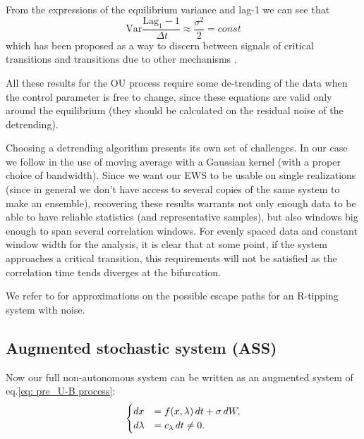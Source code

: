 From the expressions of the equilibrium variance and lag-1 we can see that 
\begin{equation}
	\mathrm{Var}\frac{\mathrm{Lag}_{1}-1}{\, \Delta t}\approx \frac{\sigma^2}{2}=const
	\label{eq:constante}
\end{equation}
which has been proposed as a way to discern between signals of critical transitions and transitions due to other mechanisms \citep{..}.


All these results for the OU process require some de-trending of the data when the control parameter is free to change, since these equations are valid only around the equilibrium (they should be calculated on the residual noise of the detrending).

Choosing a detrending algorithm presents its own set of challenges. 
In our case we follow \citep{..} in the use of moving average with a Gaussian kernel (with  a proper choice of bandwidth). 
Since we want our EWS to be usable on single realizations (since in general we don't have access to several copies of the same system to make an ensemble), recovering these results warrants not only enough data to be able to have reliable statistics (and representative samples), but also windows big enough to span several correlation windows. 
For evenly spaced data and constant window width for the analysis, it is clear that at some point, if the system approaches a critical transition, this requirements will not be satisfied as the correlation time tends diverges at the bifurcation.

We refer to \cite{Ritchie2016} for approximations on the possible escape paths for an R-tipping system with noise.

\subsection{Augmented stochastic  system (ASS)}
Now our full non-autonomous system can be written as an augmented system of eq.\eqref{eq: pre_U-B process}:
\begin{equation}
	\begin{cases}
		d x&=f(x,\lambda)\,dt+\sigma\, dW,\\
		d \lambda &= c_\lambda\, dt \neq 0.
	\end{cases}
\end{equation}

%
%

